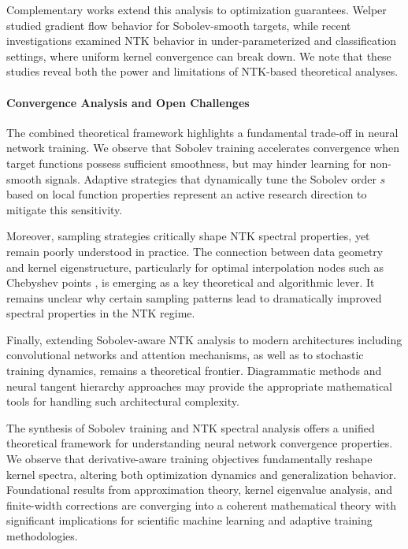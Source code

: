 \documentclass[a4paper]{article}
\theoremstyle{plain}
\theoremstyle{definition}
\theoremstyle{remark}
\begin{document}
Complementary works extend this analysis to optimization guarantees. Welper \cite{welper2023approximation} studied gradient flow behavior for Sobolev-smooth targets, while recent investigations \cite{ntk2024underparam,ntk2025divergence} examined NTK behavior in under-parameterized and classification settings, where uniform kernel convergence can break down. We note that these studies reveal both the power and limitations of NTK-based theoretical analyses.

\paragraph{Convergence Analysis and Open Challenges}

The combined theoretical framework highlights a fundamental trade-off in neural network training. We observe that Sobolev training accelerates convergence when target functions possess sufficient smoothness, but may hinder learning for non-smooth signals. Adaptive strategies that dynamically tune the Sobolev order $s$ based on local function properties represent an active research direction to mitigate this sensitivity.

Moreover, sampling strategies critically shape NTK spectral properties, yet remain poorly understood in practice. The connection between data geometry and kernel eigenstructure, particularly for optimal interpolation nodes such as Chebyshev points \cite{driscoll2014chebfun}, is emerging as a key theoretical and algorithmic lever. It remains unclear why certain sampling patterns lead to dramatically improved spectral properties in the NTK regime.

Finally, extending Sobolev-aware NTK analysis to modern architectures including convolutional networks and attention mechanisms, as well as to stochastic training dynamics, remains a theoretical frontier. Diagrammatic methods and neural tangent hierarchy approaches \cite{huang2019dynamicsdeepneuralnetworks} may provide the appropriate mathematical tools for handling such architectural complexity.

The synthesis of Sobolev training and NTK spectral analysis offers a unified theoretical framework for understanding neural network convergence properties. We observe that derivative-aware training objectives fundamentally reshape kernel spectra, altering both optimization dynamics and generalization behavior. Foundational results from approximation theory, kernel eigenvalue analysis, and finite-width corrections are converging into a coherent mathematical theory with significant implications for scientific machine learning and adaptive training methodologies.
\end{document}
